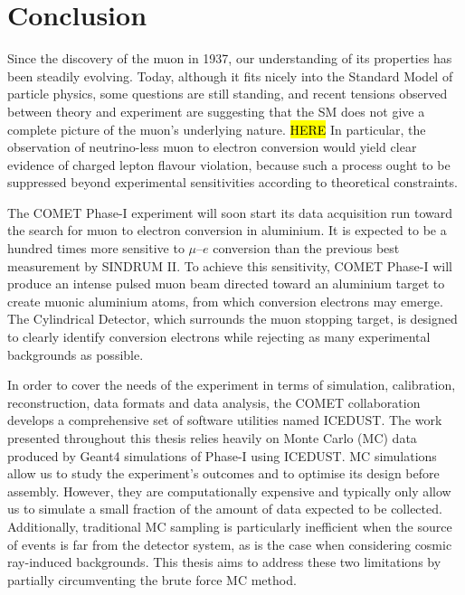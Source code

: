 \chapter{Conclusion}

Since the discovery of the muon in 1937, our understanding of its properties has
been steadily evolving. Today, although it fits nicely into the Standard Model
of particle physics, some questions are still standing, and recent tensions
observed between theory and experiment are suggesting that the SM does not give
a complete picture of the muon's underlying nature. 
\hl{HERE}
In particular, the observation of neutrino-less muon to electron
conversion would yield clear evidence of charged lepton flavour violation,
because such a process ought to be suppressed beyond experimental sensitivities
according to theoretical constraints.

The COMET Phase-I experiment will soon start its data acquisition run toward the
search for muon to electron conversion in aluminium. It is expected to be a
hundred times more sensitive to $\mu$--$e$ conversion than the previous best
measurement by SINDRUM II. To achieve this sensitivity, COMET Phase-I will
produce an intense pulsed muon beam directed toward an aluminium target to
create muonic aluminium atoms, from which conversion electrons may emerge. The
Cylindrical Detector, which surrounds the muon stopping target, is designed to
clearly identify conversion electrons while rejecting as many experimental
backgrounds as possible. 

In order to cover the needs of the experiment in terms of simulation,
calibration, reconstruction, data formats and data analysis, the COMET
collaboration develops a comprehensive set of software utilities named ICEDUST.
The work presented throughout this thesis relies heavily on Monte Carlo (MC) data
produced by {\sc Geant4} simulations of Phase-I using ICEDUST.
MC simulations allow us to study the experiment's outcomes and to optimise its
design before assembly. However, they are computationally expensive and
typically only allow us to simulate a small fraction of the amount of data
expected to be collected. Additionally, traditional MC sampling is particularly
inefficient when the source of events is far from the detector system, as is the
case when considering cosmic ray-induced backgrounds. This thesis aims to
address these two limitations by partially circumventing the brute force MC
method.

